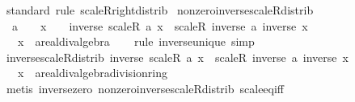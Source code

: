 \begin{isabellebody}
\endisadelimproof
%
\isatagproof
{}\isamarkupfalse%
\ standard\ {\isacharparenleft}{\kern0pt}rule\ scaleR{\isacharunderscore}{\kern0pt}right{\isacharunderscore}{\kern0pt}distrib{\isacharparenright}{\kern0pt}%
\endisatagproof
{\isafoldproof}%
%
\isadelimproof
\isanewline
%
\endisadelimproof
\isanewline
{}\isamarkupfalse%
\ nonzero{\isacharunderscore}{\kern0pt}inverse{\isacharunderscore}{\kern0pt}scaleR{\isacharunderscore}{\kern0pt}distrib{\isacharcolon}{\kern0pt}\isanewline
\ \ {\isachardoublequoteopen}a\ {\isasymnoteq}\ {}\ {\isasymLongrightarrow}\ x\ {\isasymnoteq}\ {}\ {\isasymLongrightarrow}\ inverse\ {\isacharparenleft}{\kern0pt}scaleR\ a\ x{\isacharparenright}{\kern0pt}\ {\isacharequal}{\kern0pt}\ scaleR\ {\isacharparenleft}{\kern0pt}inverse\ a{\isacharparenright}{\kern0pt}\ {\isacharparenleft}{\kern0pt}inverse\ x{\isacharparenright}{\kern0pt}{\isachardoublequoteclose}\isanewline
\ \ \ x\ {\isacharcolon}{\kern0pt}{\isacharcolon}{\kern0pt}\ {\isachardoublequoteopen}{\isacharprime}{\kern0pt}a{\isacharcolon}{\kern0pt}{\isacharcolon}{\kern0pt}real{\isacharunderscore}{\kern0pt}div{\isacharunderscore}{\kern0pt}algebra{\isachardoublequoteclose}\isanewline
%
\isadelimproof
\ \ %
\endisadelimproof
%
\isatagproof
{}\isamarkupfalse%
\ {\isacharparenleft}{\kern0pt}rule\ inverse{\isacharunderscore}{\kern0pt}unique{\isacharparenright}{\kern0pt}\ simp%
\endisatagproof
{\isafoldproof}%
%
\isadelimproof
\isanewline
%
\endisadelimproof
\isanewline
{}\isamarkupfalse%
\ inverse{\isacharunderscore}{\kern0pt}scaleR{\isacharunderscore}{\kern0pt}distrib{\isacharcolon}{\kern0pt}\ {\isachardoublequoteopen}inverse\ {\isacharparenleft}{\kern0pt}scaleR\ a\ x{\isacharparenright}{\kern0pt}\ {\isacharequal}{\kern0pt}\ scaleR\ {\isacharparenleft}{\kern0pt}inverse\ a{\isacharparenright}{\kern0pt}\ {\isacharparenleft}{\kern0pt}inverse\ x{\isacharparenright}{\kern0pt}{\isachardoublequoteclose}\isanewline
\ \ \ x\ {\isacharcolon}{\kern0pt}{\isacharcolon}{\kern0pt}\ {\isachardoublequoteopen}{\isacharprime}{\kern0pt}a{\isacharcolon}{\kern0pt}{\isacharcolon}{\kern0pt}{\isacharbraceleft}{\kern0pt}real{\isacharunderscore}{\kern0pt}div{\isacharunderscore}{\kern0pt}algebra{\isacharcomma}{\kern0pt}division{\isacharunderscore}{\kern0pt}ring{\isacharbraceright}{\kern0pt}{\isachardoublequoteclose}\isanewline
%
\isadelimproof
\ \ %
\endisadelimproof
%
\isatagproof
{}\isamarkupfalse%
\ {\isacharparenleft}{\kern0pt}metis\ inverse{\isacharunderscore}{\kern0pt}zero\ nonzero{\isacharunderscore}{\kern0pt}inverse{\isacharunderscore}{\kern0pt}scaleR{\isacharunderscore}{\kern0pt}distrib\ scale{\isacharunderscore}{\kern0pt}eq{\isacharunderscore}{\kern0pt}{}{\isacharunderscore}{\kern0pt}iff{\isacharparenright}{\kern0pt}%

\end{isabellebody}
